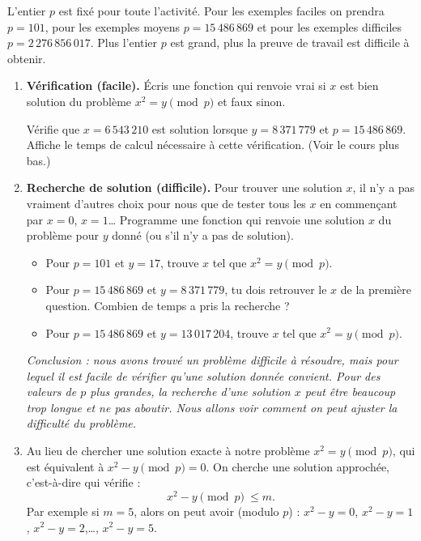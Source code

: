 \documentclass[11pt,class=report,crop=false]{standalone}
\begin{document}
\begin{activite}
\begin{itemize}
\end{itemize}


L'entier $p$ est fixé pour toute l'activité. 
Pour les exemples faciles on prendra $p = 101$, pour les exemples moyens $p = 15\,486\,869$ et pour les exemples difficiles $p = 2\,276\,856\,017$. Plus l'entier $p$ est grand, plus la preuve de travail est difficile à obtenir.

\begin{enumerate}
  \item \textbf{Vérification (facile).} 
  \'Ecris une fonction  qui renvoie \og{}vrai\fg{} si $x$ est bien solution du problème $x^2 = y \pmod{p}$ et \og{}faux\fg{} sinon.
  
  Vérifie que $x = 6\,543\,210$ est solution lorsque $y = 8\,371\,779$ et $p = 15\,486\,869$. Affiche le temps de calcul nécessaire à cette vérification. (Voir le cours plus bas.)
  
  \item \textbf{Recherche de solution (difficile).} Pour trouver une solution $x$, il n'y a pas vraiment d'autres choix pour nous que de tester tous les $x$ en commençant par $x=0$, $x=1$\ldots{}
Programme une fonction  qui renvoie une solution $x$ du problème pour $y$ donné (ou  s'il n'y a pas de solution).

  \begin{itemize}
    \item Pour $p = 101$ et $y=17$, trouve $x$ tel que $x^2 = y \pmod{p}$. 
    \item Pour $p = 15\,486\,869$ et $y = 8\,371\,779$, tu dois retrouver le $x$ de la première question. Combien de temps a pris la recherche ? 
    
    \item Pour $p = 15\,486\,869$ et $y = 13\,017\,204$, trouve $x$ tel que $x^2 = y \pmod{p}$.    
   \end{itemize}


\medskip

\emph{Conclusion : nous avons trouvé un problème difficile à résoudre, mais pour lequel il est facile de vérifier qu'une solution donnée convient. Pour des valeurs de $p$ plus grandes, la recherche d'une solution $x$ peut être beaucoup trop longue et ne pas aboutir. Nous allons voir comment on peut ajuster la difficulté du problème.}


	\item Au lieu de chercher une solution exacte à notre problème $x^2 = y \pmod{p}$, qui est équivalent à $x^2-y \pmod{p} = 0$. On cherche une solution approchée, c'est-à-dire qui vérifie : 	$$x^2 - y \pmod{p} \ \le m.$$
	Par exemple si $m=5$, alors on peut avoir (modulo $p$) : $x^2 - y = 0$, $x^2 - y = 1$,
	$x^2-y = 2$,\ldots, $x^2-y=5$. 
	

\end{enumerate}
\end{activite}
\end{document}
